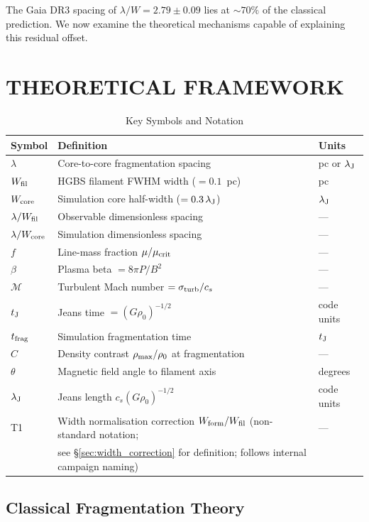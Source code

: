 \documentclass[twoside,twocolumn]{mnras}
\begin{document}
The Gaia DR3 spacing of $\lambda/W = 2.79 \pm 0.09$ lies at ${\sim}70\%$ of the
classical prediction. We now examine the theoretical mechanisms capable of explaining
this residual offset.

\section{THEORETICAL FRAMEWORK}

\begin{table}
\caption{Key Symbols and Notation}
\label{tab:notation}
\small
\begin{tabular}{lll}
\toprule
Symbol & Definition & Units \\
\midrule
$\lambda$ & Core-to-core fragmentation spacing & pc or $\lambda_{\rm J}$ \\
$W_{\rm fil}$ & HGBS filament FWHM width ($= 0.1$~pc) & pc \\
$W_{\rm core}$ & Simulation core half-width ($= 0.3\,\lambda_{\rm J}$) & $\lambda_{\rm J}$ \\
$\lambda/W_{\rm fil}$ & Observable dimensionless spacing & --- \\
$\lambda/W_{\rm core}$ & Simulation dimensionless spacing & --- \\
$f$ & Line-mass fraction $\mu/\mu_{\rm crit}$ & --- \\
$\beta$ & Plasma beta $= 8\pi P/B^2$ & --- \\
$\mathcal{M}$ & Turbulent Mach number $= \sigma_{\rm turb}/c_s$ & --- \\
$t_{\rm J}$ & Jeans time $= (G\rho_0)^{-1/2}$ & code units \\
$t_{\rm frag}$ & Simulation fragmentation time & $t_{\rm J}$ \\
$C$ & Density contrast $\rho_{\rm max}/\rho_0$ at fragmentation & --- \\
$\theta$ & Magnetic field angle to filament axis & degrees \\
$\lambda_{\rm J}$ & Jeans length $c_s(G\rho_0)^{-1/2}$ & code units \\
T1 & Width normalisation correction $W_{\rm form}/W_{\rm fil}$ (non-standard notation; & --- \\
 & see \S\ref{sec:width_correction} for definition; follows internal campaign naming) & \\
\bottomrule
\end{tabular}
\end{table}

\subsection{Classical Fragmentation Theory}
\end{document}

